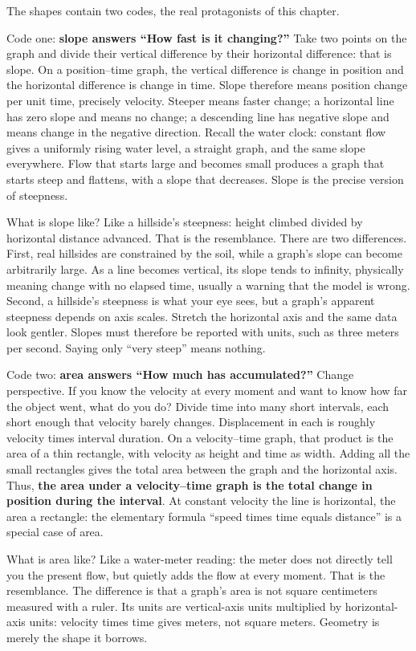 The shapes contain two codes, the real protagonists of this chapter.

Code one: \textbf{slope answers ``How fast is it changing?''} Take two points on the graph and divide their vertical difference by their horizontal difference: that is slope. On a position--time graph, the vertical difference is change in position and the horizontal difference is change in time. Slope therefore means position change per unit time, precisely velocity. Steeper means faster change; a horizontal line has zero slope and means no change; a descending line has negative slope and means change in the negative direction. Recall the water clock: constant flow gives a uniformly rising water level, a straight graph, and the same slope everywhere. Flow that starts large and becomes small produces a graph that starts steep and flattens, with a slope that decreases. Slope is the precise version of steepness.

What is slope like? Like a hillside's steepness: height climbed divided by horizontal distance advanced. That is the resemblance. There are two differences. First, real hillsides are constrained by the soil, while a graph's slope can become arbitrarily large. As a line becomes vertical, its slope tends to infinity, physically meaning change with no elapsed time, usually a warning that the model is wrong. Second, a hillside's steepness is what your eye sees, but a graph's apparent steepness depends on axis scales. Stretch the horizontal axis and the same data look gentler. Slopes must therefore be reported with units, such as three meters per second. Saying only ``very steep'' means nothing.

Code two: \textbf{area answers ``How much has accumulated?''} Change perspective. If you know the velocity at every moment and want to know how far the object went, what do you do? Divide time into many short intervals, each short enough that velocity barely changes. Displacement in each is roughly velocity times interval duration. On a velocity--time graph, that product is the area of a thin rectangle, with velocity as height and time as width. Adding all the small rectangles gives the total area between the graph and the horizontal axis. Thus, \textbf{the area under a velocity--time graph is the total change in position during the interval}. At constant velocity the line is horizontal, the area a rectangle: the elementary formula ``speed times time equals distance'' is a special case of area.

What is area like? Like a water-meter reading: the meter does not directly tell you the present flow, but quietly adds the flow at every moment. That is the resemblance. The difference is that a graph's area is not square centimeters measured with a ruler. Its units are vertical-axis units multiplied by horizontal-axis units: velocity times time gives meters, not square meters. Geometry is merely the shape it borrows.


